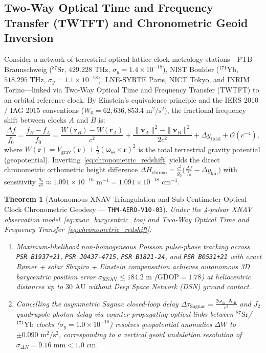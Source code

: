 \documentclass[11pt,a4paper]{article}
\theoremstyle{plain}
\newtheorem{theorem}{Theorem}[section]
\theoremstyle{definition}
\theoremstyle{remark}
\begin{document}
\subsection{Two-Way Optical Time and Frequency Transfer (TWTFT) and Chronometric Geoid Inversion}

Consider a network of terrestrial optical lattice clock metrology stations---PTB Braunschweig ($^{87}\text{Sr}$, $429.228\text{ THz}$, $\sigma_y = 1.4\times 10^{-18}$), NIST Boulder ($^{171}\text{Yb}$, $518.295\text{ THz}$, $\sigma_y = 1.1\times 10^{-18}$), LNE-SYRTE Paris, NICT Tokyo, and INRIM Torino---linked via Two-Way Optical Time and Frequency Transfer (TWTFT) to an orbital reference clock. By Einstein's equivalence principle and the IERS 2010 / IAG 2015 conventions ($W_0 = 62,636,853.4\text{ m}^2/\text{s}^2$), the fractional frequency shift between clocks $A$ and $B$ is:
\begin{equation}\label{eq:chronometric_redshift}
  \frac{\Delta f}{f_0} = \frac{f_B - f_A}{f_0} = \frac{W(\mathbf{r}_B) - W(\mathbf{r}_A)}{c^2} + \frac{\|\mathbf{v}_A\|^2 - \|\mathbf{v}_B\|^2}{2c^2} + \Delta y_{\text{tidal}} + \mathcal{O}(c^{-4}),
\end{equation}
where $W(\mathbf{r}) = V_{\text{grav}}(\mathbf{r}) + \frac{1}{2}(\bm{\omega}_\oplus \times \mathbf{r})^2$ is the total terrestrial gravity potential (geopotential). Inverting~\eqref{eq:chronometric_redshift} yields the direct chronometric orthometric height difference $\Delta H_{\text{chrono}} = \frac{c^2}{g_0}\bigl(\frac{\Delta f}{f_0} - \Delta y_{\text{kin}}\bigr)$ with sensitivity $\frac{g_0}{c^2} \approx 1.091\times 10^{-16}\text{ m}^{-1} = 1.091\times 10^{-18}\text{ cm}^{-1}$.

\begin{theorem}[Autonomous XNAV Triangulation and Sub-Centimeter Optical Clock Chronometric Geodesy --- \texttt{THM-AERO-V10-03}]\label{thm:aero_v10_xnav_chrono}
Under the 4-pulsar XNAV observation model~\eqref{eq:xnav_barycentric_toa} and Two-Way Optical Time and Frequency Transfer~\eqref{eq:chronometric_redshift}:
\begin{enumerate}[label=(\roman*),leftmargin=2em]
  \item Maximum-likelihood non-homogeneous Poisson pulse-phase tracking across \texttt{PSR B1937+21}, \texttt{PSR J0437-4715}, \texttt{PSR B1821-24}, and \texttt{PSR B0531+21} with exact R\o mer + solar Shapiro + Einstein compensation achieves autonomous 3D barycentric position error $\sigma_{\text{XNAV}} \le 184.2\text{ m}$ ($\text{GDOP} = 1.78$) at heliocentric distances up to $30\text{ AU}$ without Deep Space Network (DSN) ground contact.
  \item Cancelling the asymmetric Sagnac closed-loop delay $\Delta\tau_{\text{Sagnac}} = \frac{2\bm{\omega}_\oplus \cdot \mathbf{A}_{\text{eff}}}{c^2}$ and $J_2$ quadrupole photon delay via counter-propagating optical links between $^{87}\text{Sr}$/$^{171}\text{Yb}$ clocks ($\sigma_y = 1.0\times 10^{-18}$) resolves geopotential anomalies $\Delta W$ to $\pm 0.090\text{ m}^2/\text{s}^2$, corresponding to a vertical geoid undulation resolution of $\sigma_{\Delta N} = 9.16\text{ mm} < 1.0\text{ cm}$.
\end{enumerate}
\end{theorem}
\end{document}
